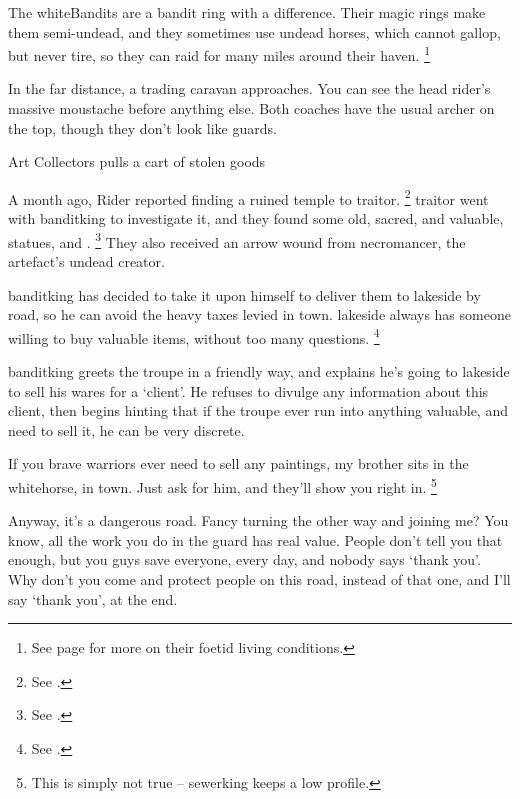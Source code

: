 
\noindent
The \gls{whiteBandits} are a bandit ring with a difference.
Their magic rings make them semi-undead, and they sometimes use undead horses, which cannot gallop, but never tire, so they can raid for many miles around their haven.%
\footnote{See page \pageref{necromancers_lair} for more on their foetid living conditions.}

\begin{boxtext}
  In the far distance, a trading caravan approaches.
  You can see the head rider's massive moustache before anything else.
  Both coaches have the usual archer on the top, though they don't look like \glspl{guard}.
\end{boxtext}

{Art Collectors}%
{ pulls a cart of stolen goods}%

\begin{exampletext}
  A month ago,  Rider reported finding a ruined temple to \gls{traitor}.%
  \footnote{See .}
  \Gls{traitor} went with \gls{banditking} to investigate it, and they found some old, sacred, and valuable, statues, and .%
  \footnote{See .}
  They also received an arrow wound from \gls{necromancer}, the \gls{artefact}'s undead creator.

  \Gls{banditking} has decided to take it upon himself to deliver them to \gls{lakeside} by road, so he can avoid the heavy taxes levied in \gls{town}.%
  \Gls{lakeside} always has someone willing to buy valuable items, without too many questions.
  \footnote{See .}
\end{exampletext}

\setcounter{wounds}{2}

\banditking

\Gls{banditking} greets the troupe in a friendly way, and explains he's going to \gls{lakeside} to sell his wares for a `client'.
He refuses to divulge any information about this client, then begins hinting that if the troupe ever run into anything valuable, and need to sell it, he can be very discrete.

\begin{speechtext}
  If you brave warriors ever need to sell any paintings, my brother sits in the \gls{whitehorse}, in \gls{town}.
  Just ask for him, and they'll show you right in.%
  \footnote{This is simply not true -- \gls{sewerking} keeps a low profile.}

  Anyway, it's a dangerous road.
  Fancy turning the other way and joining me?
  You know, all the work you do in the \gls{guard} has real value.
  People don't tell you that enough, but you guys save everyone, every day, and nobody says `thank you'.
  Why don't you come and protect people on this road, instead of that one, and I'll say `thank you', at the end.
\end{speechtext}

